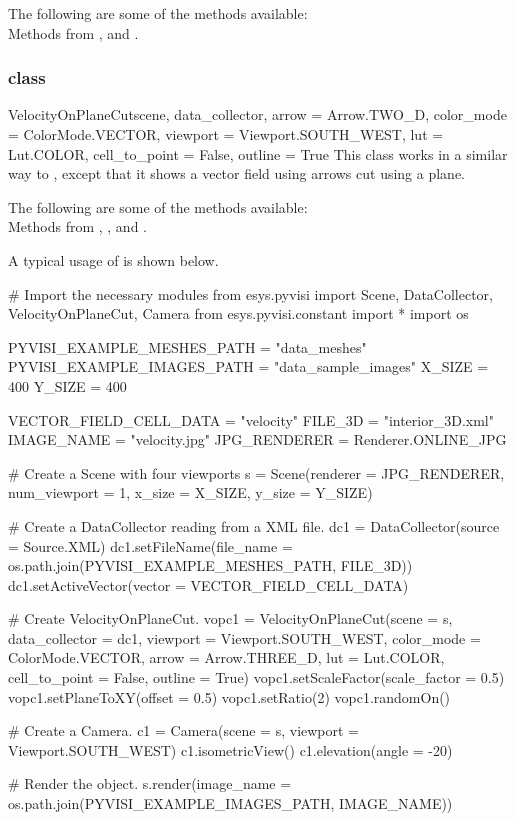 The following are some of the methods available:\\
Methods from \ActorThreeD, \GlyphThreeD and \MaskPoints. 

\subsubsection{\VelocityOnPlaneCut class}

\begin{classdesc}{VelocityOnPlaneCut}{scene, data_collector,
arrow = Arrow.TWO_D, color_mode = ColorMode.VECTOR, 
viewport = Viewport.SOUTH_WEST, lut = Lut.COLOR, 
cell_to_point = False, outline = True}
This class works in a similar way to \MapOnPlaneCut, except that 
it shows a vector field using arrows cut using a plane.
\end{classdesc}

The following are some of the methods available:\\
Methods from \ActorThreeD, \GlyphThreeD, \Transform and \MaskPoints. 

A typical usage of \VelocityOnPlaneCut is shown below.

\begin{python}
# Import the necessary modules
from esys.pyvisi import Scene, DataCollector, VelocityOnPlaneCut, Camera
from esys.pyvisi.constant import *
import os

PYVISI_EXAMPLE_MESHES_PATH = "data_meshes"
PYVISI_EXAMPLE_IMAGES_PATH = "data_sample_images"
X_SIZE = 400
Y_SIZE = 400

VECTOR_FIELD_CELL_DATA = "velocity"
FILE_3D = "interior_3D.xml"
IMAGE_NAME = "velocity.jpg"
JPG_RENDERER = Renderer.ONLINE_JPG

# Create a Scene with four viewports
s = Scene(renderer = JPG_RENDERER, num_viewport = 1, x_size = X_SIZE, 
        y_size = Y_SIZE)

# Create a DataCollector reading from a XML file.
dc1 = DataCollector(source = Source.XML)
dc1.setFileName(file_name = os.path.join(PYVISI_EXAMPLE_MESHES_PATH, FILE_3D))
dc1.setActiveVector(vector = VECTOR_FIELD_CELL_DATA)

# Create VelocityOnPlaneCut.
vopc1 = VelocityOnPlaneCut(scene = s, data_collector = dc1, 
        viewport = Viewport.SOUTH_WEST, color_mode = ColorMode.VECTOR, 
        arrow = Arrow.THREE_D, lut = Lut.COLOR, cell_to_point = False, 
        outline = True)
vopc1.setScaleFactor(scale_factor = 0.5)
vopc1.setPlaneToXY(offset = 0.5)
vopc1.setRatio(2)
vopc1.randomOn()

# Create a Camera.
c1 = Camera(scene = s, viewport = Viewport.SOUTH_WEST)
c1.isometricView()
c1.elevation(angle = -20)

# Render the object.
s.render(image_name = os.path.join(PYVISI_EXAMPLE_IMAGES_PATH, IMAGE_NAME))
\end{python}

